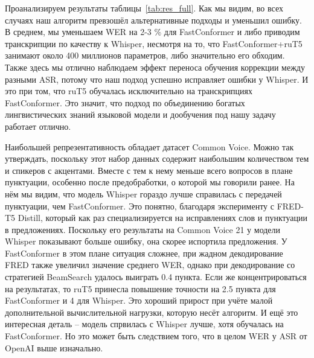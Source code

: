 Проанализируем результаты таблицы~\ref{tab:res_full}.
Как мы видим, во всех случаях наш алгоритм превзошёл альтернативные подходы и уменьшил ошибку.
В среднем, мы уменьшаем WER на 2-3 \% для FastConformer и либо приводим транскрипции по качеству к Whisper, несмотря на то, что FastConformer+ruT5 занимают около 400 миллионов параметров, либо значительно его обходим.
Также здесь мы отлично наблюдаем эффект переноса обучения коррекции между разными ASR, потому что наш подход успешно исправляет ошибки у Whisper.
И это при том, что ruT5 обучалась исключительно на транскрипциях FastConformer.
Это значит, что подход по объединению богатых лингвистических знаний языковой модели и дообучения под нашу задачу работает отлично.

Наибольшей репрезентативность обладает датасет Common Voice.
Можно так утверждать, поскольку этот набор данных содержит наибольшим количеством тем и спикеров с акцентами.
Вместе с тем к нему меньше всего вопросов в плане пунктуации, особенно после предобработки, о которой мы говорили ранее.
На нём мы видим, что модель Whisper гораздо лучше справилась с передачей пунктуации, чем FastConformer.
Это понятно, благодаря эксперименту с FRED-T5 Distill, который как раз специализируется на исправлениях слов и пунктуации в предложениях.
Поскольку его результаты на Common Voice 21 у модели Whisper показывают больше ошибку, она скорее испортила предложения.
У FastConformer в этом плане ситуация сложнее, при жадном декодирование FRED также увеличил значение среднего WER, однако при декодирование со стратегией BeamSearch удалось выиграть 0.4 пункта.
Если же концентрироваться на результатах, то ruT5 принесла повышение точности на 2.5 пункта для FastConformer и 4 для Whisper.
Это хороший прирост при учёте малой дополнительной вычислительной нагрузки, которую несёт алгоритм.
И ещё это интересная деталь -- модель спрвилась с Whisper лучше, хотя обучалась на FastConformer.
Но это может быть следствием того, что в целом WER у ASR от OpenAI выше изначально.

